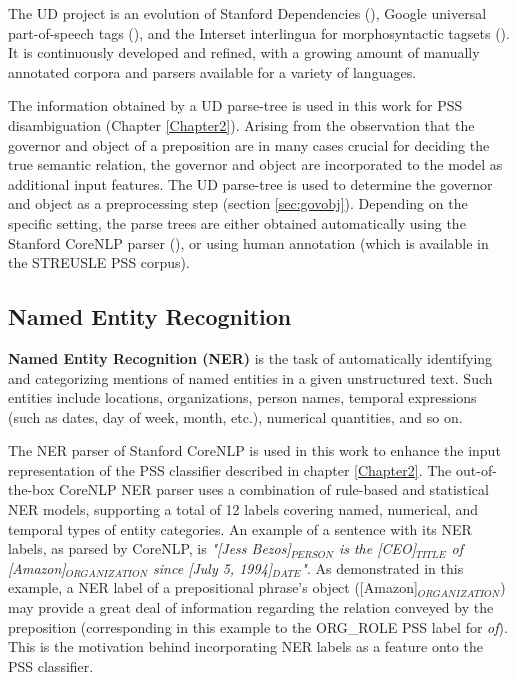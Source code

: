 The UD project is an evolution of Stanford Dependencies (\cite{de-marneffe-etal-14-universal}), Google universal part-of-speech tags (\cite{37072}), and the Interset interlingua for morphosyntactic tagsets (\cite{Zeman08ReusableTC}). It is continuously developed and refined, with a growing amount of manually annotated corpora and parsers available for a variety of languages. 

The information obtained by a UD parse-tree is used in this work for PSS disambiguation (Chapter \ref{Chapter2}). Arising from the observation that the governor and object of a preposition are in many cases crucial for deciding the true semantic relation, the governor and object are incorporated to the model as additional input features. The UD parse-tree is used to determine the governor and object as a preprocessing step (section \ref{sec:govobj}). Depending on the specific setting, the parse trees are either obtained automatically using the Stanford CoreNLP parser (\cite{manning14stanford}), or using human annotation (which is available in the STREUSLE PSS corpus).

\subsection{Named Entity Recognition}
\textbf{Named Entity Recognition (NER)} is the task of automatically identifying and categorizing mentions of named entities in a given unstructured text. Such entities include locations, organizations, person names, temporal expressions (such as dates, day of week, month, etc.), numerical quantities, and so on.

The NER parser of Stanford CoreNLP is used in this work to enhance the input representation of the PSS classifier described in chapter \ref{Chapter2}. The out-of-the-box CoreNLP NER parser uses a combination of rule-based and statistical NER models, supporting a total of 12 labels covering named, numerical, and temporal types of entity categories. An example of a sentence with its NER labels, as parsed by CoreNLP, is \emph{"[Jess Bezos]$_{PERSON}$ is the [CEO]$_{TITLE}$ of [Amazon]$_{ORGANIZATION}$ since [July 5, 1994]$_{DATE}$"}. As demonstrated in this example, a NER label of a prepositional phrase's object ([Amazon]$_{ORGANIZATION}$) may provide a great deal of information regarding the relation conveyed by the preposition (corresponding in this example to the ORG\_ROLE PSS label for \emph{of}). This is the motivation behind incorporating NER labels as a feature onto the PSS classifier.

